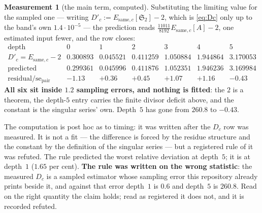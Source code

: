 \documentclass[11pt,a4paper]{article}
\theoremstyle{plain}
\theoremstyle{definition}
\newtheorem{measurement}[theorem]{Measurement}
\theoremstyle{remark}
\renewcommand{\SS}{\mathfrak{S}}
\begin{document}
\begin{measurement}[the main term, computed]
Substituting the limiting value for the sampled one --- writing
$D'_c:=E_{\mathrm{same},c}[\SS_2]-2$, which is \eqref{eq:Dc} only up to
the band's own $1.4\cdot10^{-5}$ --- the prediction reads
$\tfrac{11011}{8192}E_{\mathrm{same},c}[A]-2$, one estimated input
fewer, and
the row closes:
\[
\begin{array}{r|cccccc}
 \text{depth} & 0 & 1 & 2 & 3 & 4 & 5\\\hline
 D'_c=E_{\mathrm{same},c}-2 & 0.300893 & 0.045521 & 0.411259 & 1.050884
   & 1.944864 & 3.170053\\
 \text{predicted} & 0.299361 & 0.045996 & 0.411876 & 1.052351
   & 1.946236 & 3.169984\\
 \text{residual}/\mathrm{se}_{\mathrm{pair}} & -1.13 & +0.36 & +0.45 & +1.07 & +1.16
   & -0.43
\end{array}
\]
\textbf{All six sit inside $1.2$ sampling errors, and nothing is
fitted}: the $2$ is a theorem, the depth-$5$ entry carries the finite
divisor deficit above, and the constant is the singular series' own.
Depth~$5$ has gone from $260.8$ to $-0.43$.

The computation is post hoc as to timing: it was written after the
$D_c$ row was measured. It is not a fit --- the difference is forced by
the residue structure and the constant by the definition of the
singular series --- but a registered rule of it was refuted. The rule
predicted the worst relative deviation at depth~$5$; it is at depth~$1$
($1.65$ per cent). \textbf{The rule was written on the wrong
statistic}: the measured $D_c$ is a sampled estimator whose sampling
error this repository already prints beside it, and against that error
depth~$1$ is $0.6$ and depth~$5$ is $260.8$. Read on the right
quantity the claim holds; read as registered it does not, and it is
recorded refuted.
\end{measurement}
\end{document}
